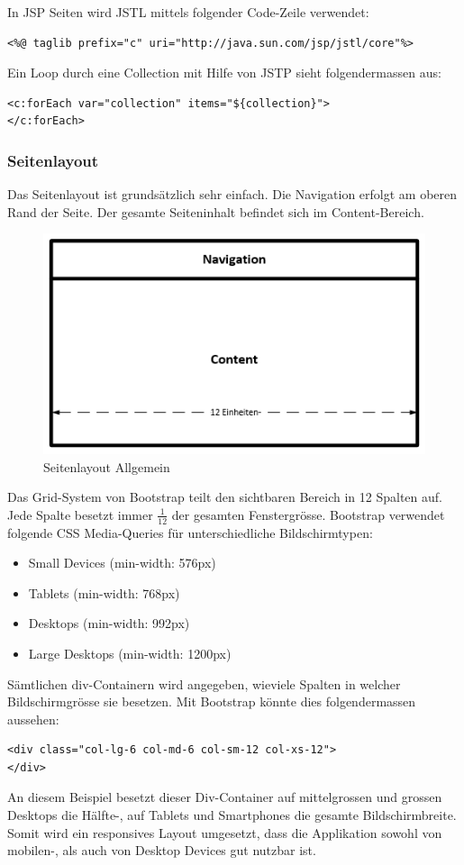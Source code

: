 In JSP Seiten wird JSTL mittels folgender Code-Zeile verwendet:
\begin{lstlisting}[language=html5]
<%@ taglib prefix="c" uri="http://java.sun.com/jsp/jstl/core"%>
\end{lstlisting}

Ein Loop durch eine Collection mit Hilfe von JSTP sieht folgendermassen aus:
\begin{lstlisting}[language=html5]
<c:forEach var="collection" items="${collection}">
</c:forEach>
\end{lstlisting}

\subsubsection{Seitenlayout}
Das Seitenlayout ist grundsätzlich sehr einfach. Die Navigation erfolgt am oberen Rand der Seite. Der gesamte Seiteninhalt befindet sich im Content-Bereich. 
\begin{figure}[H]
\centering
\includegraphics[scale=0.9]{../04_Realisierung/images/userinterface/seitenlayout_allgemein_large.png}
\caption{Seitenlayout Allgemein}
\end{figure}
Das Grid-System von Bootstrap teilt den sichtbaren Bereich in 12 Spalten auf. Jede Spalte besetzt immer $\frac{1}{12}$ der gesamten Fenstergrösse. Bootstrap verwendet folgende CSS Media-Queries für unterschiedliche Bildschirmtypen:
\begin{itemize}
\item Small Devices (min-width: 576px)
\item Tablets (min-width: 768px)
\item Desktops (min-width: 992px)
\item Large Desktops (min-width: 1200px)
\end{itemize}
Sämtlichen div-Containern wird angegeben, wieviele Spalten in welcher Bildschirmgrösse sie besetzen. Mit Bootstrap könnte dies folgendermassen aussehen: 
\begin{lstlisting}[language=html5]
<div class="col-lg-6 col-md-6 col-sm-12 col-xs-12">
</div>
\end{lstlisting}
An diesem Beispiel besetzt dieser Div-Container auf mittelgrossen und grossen Desktops die Hälfte-, auf Tablets und Smartphones die gesamte Bildschirmbreite. Somit wird ein responsives Layout umgesetzt, dass die Applikation sowohl von mobilen-, als auch von Desktop Devices gut nutzbar ist.


